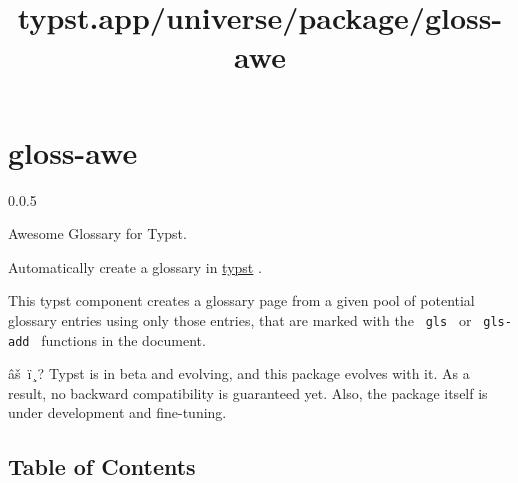 \title{typst.app/universe/package/gloss-awe}

\label{banner}
\section{gloss-awe}\label{gloss-awe}

{ 0.0.5 }

Awesome Glossary for Typst.

\label{readme}
Automatically create a glossary in \href{https://typst.app/}{typst} .

This typst component creates a glossary page from a given pool of
potential glossary entries using only those entries, that are marked
with the \texttt{\ gls\ } or \texttt{\ gls-add\ } functions in the
document.

âš~ï¸? Typst is in beta and evolving, and this package evolves with it.
As a result, no backward compatibility is guaranteed yet. Also, the
package itself is under development and fine-tuning.

\subsection{Table of Contents}\label{table-of-contents}

